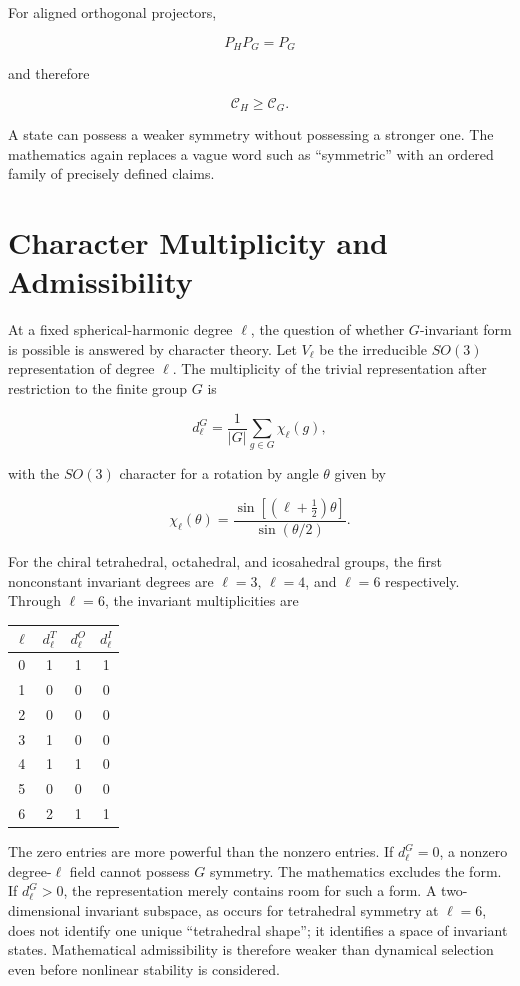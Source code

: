 For aligned orthogonal projectors,

\[
P_HP_G=P_G
\]

and therefore

\[
\mathscr C_H\ge \mathscr C_G.
\]

A state can possess a weaker symmetry without possessing a stronger one. The mathematics again replaces a vague word such as ``symmetric'' with an ordered family of precisely defined claims.

\section{Character Multiplicity and Admissibility}

At a fixed spherical-harmonic degree $\ell$, the question of whether $G$-invariant form is possible is answered by character theory. Let $V_\ell$ be the irreducible $SO(3)$ representation of degree $\ell$. The multiplicity of the trivial representation after restriction to the finite group $G$ is

\[
d_\ell^G=\frac1{|G|}\sum_{g\in G}\chi_\ell(g),
\]

with the $SO(3)$ character for a rotation by angle $\theta$ given by

\[
\chi_\ell(\theta)=\frac{\sin[(\ell+\frac12)\theta]}{\sin(\theta/2)}.
\]

For the chiral tetrahedral, octahedral, and icosahedral groups, the first nonconstant invariant degrees are $\ell=3$, $\ell=4$, and $\ell=6$ respectively. Through $\ell=6$, the invariant multiplicities are

\begin{center}
\begin{tabular}{c c c c}
\toprule
$\ell$ & $d_\ell^T$ & $d_\ell^O$ & $d_\ell^I$ \\
\midrule
0 & 1 & 1 & 1 \\
1 & 0 & 0 & 0 \\
2 & 0 & 0 & 0 \\
3 & 1 & 0 & 0 \\
4 & 1 & 1 & 0 \\
5 & 0 & 0 & 0 \\
6 & 2 & 1 & 1 \\
\bottomrule
\end{tabular}
\end{center}

The zero entries are more powerful than the nonzero entries. If $d_\ell^G=0$, a nonzero degree-$\ell$ field cannot possess $G$ symmetry. The mathematics excludes the form. If $d_\ell^G>0$, the representation merely contains room for such a form. A two-dimensional invariant subspace, as occurs for tetrahedral symmetry at $\ell=6$, does not identify one unique ``tetrahedral shape''; it identifies a space of invariant states. Mathematical admissibility is therefore weaker than dynamical selection even before nonlinear stability is considered.

